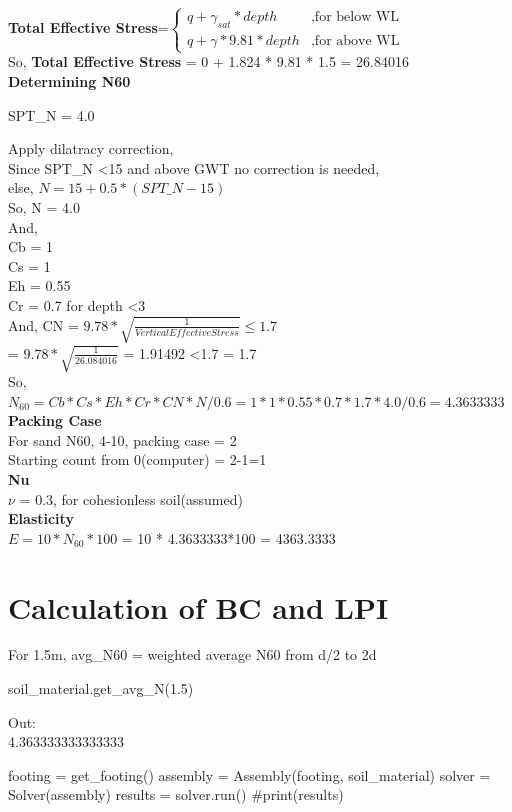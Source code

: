 \textbf{Total Effective Stress}=$
\begin{cases}
q + \gamma_{sat} *depth & ,\text{for below WL}\\
q + \gamma * 9.81 * depth & ,\text{for above WL}
\end{cases}
$\\
So, \textbf{Total Effective Stress} = 0 + 1.824 * 9.81 * 1.5 = 26.84016\\

\textbf{Determining N60}

SPT\_N = 4.0

Apply dilatracy correction,\\
Since SPT\_N \textless 15 and above GWT no correction is needed,\\
else, $N = 15 + 0.5 * (SPT\_N - 15)$\\
So, N = 4.0\\
And,\\
Cb = 1\\
Cs = 1\\
Eh = 0.55\\
Cr = 0.7 for depth \textless 3 \\
And, CN = $9.78*\sqrt{\frac{1}{Vertical Effective Stress}} \le 1.7 $\\ = $9.78 * \sqrt{\frac{1}{26.084016}}$ = 1.91492 \textless 1.7 = 1.7\\
So, $N_{60} = Cb*Cs*Eh*Cr*CN*N/0.6 = 1*1*0.55*0.7*1.7*4.0/0.6 = 4.3633333$
\\
\textbf{Packing Case}\\
For sand N60, 4-10, packing case = 2\\
Starting count from 0(computer) = 2-1=1
\\
\textbf{Nu}\\
$\nu$ = 0.3, for cohesionless soil(assumed)
\\
\textbf{Elasticity}\\
$E = 10*N_{60}*100$ = 10 * 4.3633333*100 = 4363.3333\\

\section{Calculation of  BC and LPI}
For 1.5m, avg\_N60 = weighted average N60 from d/2 to 2d
\begin{python}
soil_material.get_avg_N(1.5)
\end{python}
Out:\\
4.363333333333333\\
\begin{python}
footing = get_footing()
assembly = Assembly(footing, soil_material)
solver = Solver(assembly)
results = solver.run()
#print(results)
\end{python}
